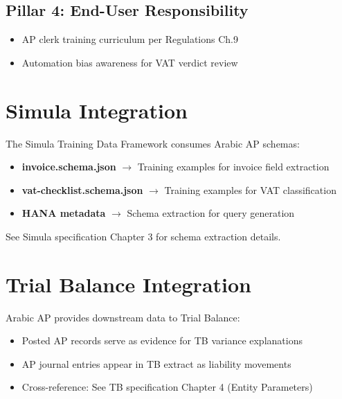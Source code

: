 \documentclass[11pt,a4paper,twoside]{report}
\begin{document}
\subsection{Pillar 4: End-User Responsibility}

\begin{itemize}
  \item AP clerk training curriculum per Regulations Ch.9
  \item Automation bias awareness for VAT verdict review
\end{itemize}

\section{Simula Integration}
\label{sec:simula-integration}

The Simula Training Data Framework consumes Arabic AP schemas:

\begin{itemize}
  \item \textbf{invoice.schema.json} $\rightarrow$ Training examples for invoice field extraction
  \item \textbf{vat-checklist.schema.json} $\rightarrow$ Training examples for VAT classification
  \item \textbf{HANA metadata} $\rightarrow$ Schema extraction for query generation
\end{itemize}

See Simula specification Chapter 3 for schema extraction details.

\section{Trial Balance Integration}
\label{sec:tb-integration}

Arabic AP provides downstream data to Trial Balance:

\begin{itemize}
  \item Posted AP records serve as evidence for TB variance explanations
  \item AP journal entries appear in TB extract as liability movements
  \item Cross-reference: See TB specification Chapter 4 (Entity Parameters)
\end{itemize}
\end{document}
